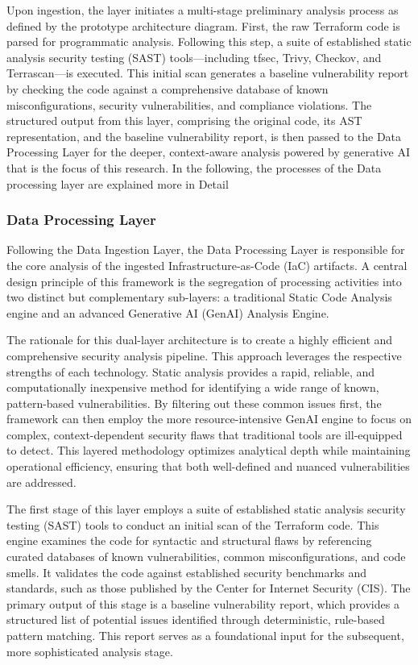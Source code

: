 Upon ingestion, the layer initiates a multi-stage preliminary analysis process as defined by the prototype architecture diagram. First, the raw Terraform code is parsed for programmatic analysis. Following this step, a suite of established static analysis security testing (SAST) tools—including tfsec, Trivy, Checkov, and Terrascan—is executed. This initial scan generates a baseline vulnerability report by checking the code against a comprehensive database of known misconfigurations, security vulnerabilities, and compliance violations. The structured output from this layer, comprising the original code, its AST representation, and the baseline vulnerability report, is then passed to the Data Processing Layer for the deeper, context-aware analysis powered by generative AI that is the focus of this research. In the following, the processes of the Data processing layer are explained more in Detail


\subsubsection{Data Processing Layer} %
\label{sec:Data Processing Layer}

Following the Data Ingestion Layer, the Data Processing Layer is responsible for the core analysis of the ingested Infrastructure-as-Code (IaC) artifacts. A central design principle of this framework is the segregation of processing activities into two distinct but complementary sub-layers: a traditional Static Code Analysis engine and an advanced Generative AI (GenAI) Analysis Engine.

The rationale for this dual-layer architecture is to create a highly efficient and comprehensive security analysis pipeline. This approach leverages the respective strengths of each technology. Static analysis provides a rapid, reliable, and computationally inexpensive method for identifying a wide range of known, pattern-based vulnerabilities. By filtering out these common issues first, the framework can then employ the more resource-intensive GenAI engine to focus on complex, context-dependent security flaws that traditional tools are ill-equipped to detect. This layered methodology optimizes analytical depth while maintaining operational efficiency, ensuring that both well-defined and nuanced vulnerabilities are addressed.

The first stage of this layer employs a suite of established static analysis security testing (SAST) tools to conduct an initial scan of the Terraform code. This engine examines the code for syntactic and structural flaws by referencing curated databases of known vulnerabilities, common misconfigurations, and code smells. It validates the code against established security benchmarks and standards, such as those published by the Center for Internet Security (CIS). The primary output of this stage is a baseline vulnerability report, which provides a structured list of potential issues identified through deterministic, rule-based pattern matching. This report serves as a foundational input for the subsequent, more sophisticated analysis stage.

